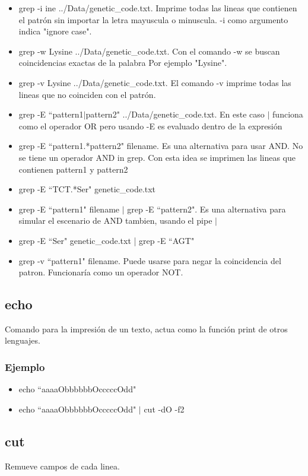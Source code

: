 \documentclass[10pt]{article}
\begin{document}
\begin{itemize}

\item grep -i ine ../Data/genetic\_code.txt.  Imprime todas las lineas que contienen el patrón sin importar la letra mayuscula o minuscula. -i como argumento indica "ignore case".

\item grep -w Lysine ../Data/genetic\_code.txt. Con el comando -w se buscan coincidencias exactas de la palabra Por ejemplo "Lysine".
\item grep -v Lysine ../Data/genetic\_code.txt. El comando -v imprime todas las lineas que no coinciden con el patrón.
\item grep -E ``pattern1$|$pattern2" ../Data/genetic\_code.txt. En este caso $|$ funciona como el operador OR pero usando -E es evaluado dentro de la expresión
\item grep -E ``pattern1.*pattern2" filename. Es una alternativa para usar AND. No se tiene un operador AND in grep. Con esta idea se imprimen las lineas que contienen pattern1 y pattern2 
\item grep -E ``TCT.*Ser" genetic\_code.txt
\item grep -E ``pattern1" filename $|$ grep -E ``pattern2". Es una alternativa para simular el escenario de AND tambien, usando el pipe $|$
\item grep -E ``Ser" genetic\_code.txt  | grep -E ``AGT"
\item grep -v ``pattern1" filename. Puede usarse para negar la coincidencia del patron. Funcionaría como un operador NOT.
\end{itemize}

\subsection{echo}
Comando para la impresión de un texto, actua como la función print de otros lenguajes.

\subsubsection{Ejemplo}
\begin{itemize}
\item echo ``aaaaObbbbbbOcccccOdd"
\item echo ``aaaaObbbbbbOcccccOdd" $|$ cut -dO -f2
\end{itemize}

\subsection{cut}
Remueve campos de cada linea.
\end{document}
